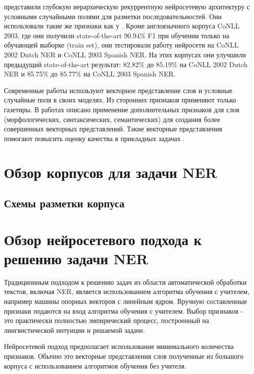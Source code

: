     \citep{DBLP:journals/corr/YangSC16} представили глубокую иерархическую рекуррентную нейросетевую
    архитектуру с условными случайными полями для разметки последовательностей.
    Они использовали такие же признаки как у \citep{collobert2011natural}.
    Кроме англоязычного корпуса CoNLL 2003, где они получили state-of-the-art 90.94\% F1 при обучении
    только на обучающей выборке (train set), они тестировали работу нейросети на CoNLL 2002 Dutch NER и CoNLL 2003 Spanish NER.
    На этих корпусах они улучшили предыдущий state-of-the-art результат:
    82.82\% до 85.19\% на CoNLL 2002 Dutch NER и 85.75\% до 85.77\% на CoNLL 2003 Spanish NER.

    Современные работы используют векторное представление слов
    и условные случайные поля в своих моделях. Из сторонних признаков применяют
    только газетиры. В работах \citep{xu2014rc, bian2014knowledge} описано применение дополнительных признаков для
    слов (морфологических, синтаксических, семантических) для создания более
    совершенных векторных представлений.
    Такие векторные представления помогают повысить оценку качества в
    прикладных задачах \citep{xu2014rc}.

  \section{Обзор корпусов для задачи NER}

  \subsection{Схемы разметки корпуса}

  \section{Обзор нейросетевого подхода к решению задачи NER}

  Традиционным подходом к решению задач из области автоматической обработки текстов,
  включая NER, является использованием алгоритма обучения с учителем, например
  машины опорных векторов с линейным ядром. Вручную составленные признаки подаются на вход
  алгоритма обучения с учителем. Выбор признаков - это практически полностью эмпирический
  процесс, построенный на лингвистической интуиции и решаемой задаче.

  Нейросетевой подход предполагает использование минимального количества признаков.
  Обычно это векторные представления слов полученные из большого корпуса с использованием
  алгоритмов обучения без учителя.

